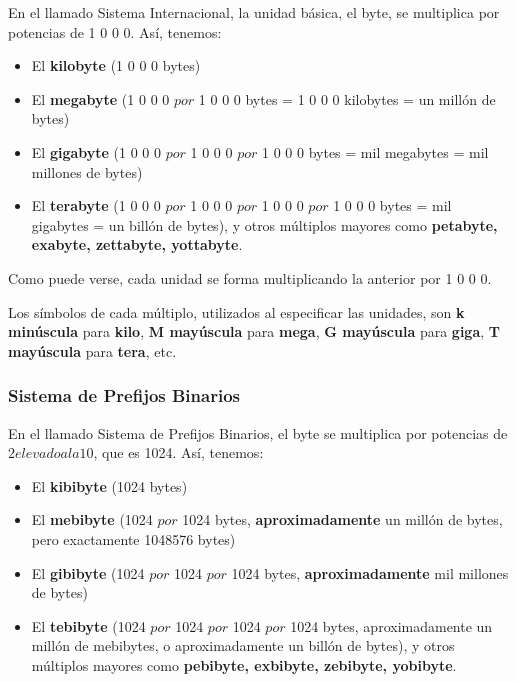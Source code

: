\documentclass[spanish,A4,]{article}
\begin{document}
En el llamado Sistema Internacional, la unidad básica, el byte, se
multiplica por potencias de 1 0 0 0. Así, tenemos:

\begin{itemize}
\itemsep1pt\parskip0pt
\item
  El \textbf{kilobyte} (1 0 0 0 bytes)
\item
  El \textbf{megabyte} (1 0 0 0 $ por $ 1 0 0 0 bytes = 1 0 0 0 kilobytes = un
  millón de bytes)
\item
  El \textbf{gigabyte} (1 0 0 0 $ por $ 1 0 0 0 $ por $ 1 0 0 0 bytes = mil
  megabytes = mil millones de bytes)
\item
  El \textbf{terabyte} (1 0 0 0 $ por $ 1 0 0 0 $ por $ 1 0 0 0 $ por $ 1 0 0 0
  bytes = mil gigabytes = un billón de bytes), y otros múltiplos mayores
  como \textbf{petabyte, exabyte, zettabyte, yottabyte}.
\end{itemize}

Como puede verse, cada unidad se forma multiplicando la anterior por
1 0 0 0.

Los símbolos de cada múltiplo, utilizados al especificar las unidades,
son \textbf{k minúscula} para \textbf{kilo}, \textbf{M mayúscula} para
\textbf{mega}, \textbf{G mayúscula} para \textbf{giga}, \textbf{T
mayúscula} para \textbf{tera}, etc.

\subsubsection{Sistema de Prefijos
Binarios}\label{sistema-de-prefijos-binarios}

En el llamado Sistema de Prefijos Binarios, el byte se multiplica por
potencias de $2 elevado a la {10}$, que es 1024. Así, tenemos:

\begin{itemize}
\itemsep1pt\parskip0pt
\item
  El \textbf{kibibyte} (1024 bytes)
\item
  El \textbf{mebibyte} (1024 $ por $ 1024 bytes,
  \textbf{aproximadamente} un millón de bytes, pero exactamente 1048576
  bytes)
\item
  El \textbf{gibibyte} (1024 $ por $ 1024 $ por $ 1024 bytes,
  \textbf{aproximadamente} mil millones de bytes)
\item
  El \textbf{tebibyte} (1024 $ por $ 1024 $ por $ 1024 $ por $ 1024
  bytes, aproximadamente un millón de mebibytes, o aproximadamente un
  billón de bytes), y otros múltiplos mayores como \textbf{pebibyte,
  exbibyte, zebibyte, yobibyte}.
\end{itemize}
\end{document}
